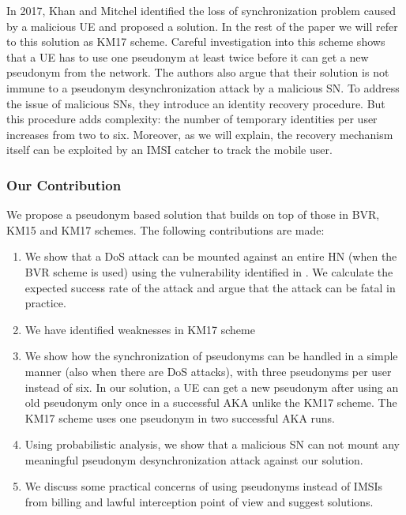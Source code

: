 \documentclass{llncs} %
\begin{document}
In 2017, Khan and Mitchel \cite{wisec17} identified the loss of synchronization problem caused by a malicious UE and proposed a solution. In the rest of the paper we will refer to this solution as KM17 scheme. Careful investigation into this scheme shows that a UE has to use one pseudonym at least twice before it can get a new pseudonym from the network. The authors also argue that their solution is not immune to a pseudonym desynchronization attack by a malicious SN. To address the issue of malicious SNs, they introduce an identity recovery procedure. But this procedure adds complexity: the number of temporary identities per user increases from two to six. Moreover, as we will explain, the recovery mechanism itself can be exploited by an IMSI catcher to track the mobile user.


\subsubsection{Our Contribution}
We propose a pseudonym based solution that builds on top of those in BVR, KM15 and KM17 schemes. The following contributions are made:
\begin{enumerate}
\item We show that a DoS attack can be mounted against an entire HN (when the BVR scheme is used) using the vulnerability identified in \cite{wisec17}. We calculate the expected success rate of the attack and argue that the attack can be fatal in practice.
\item We have identified weaknesses in KM17 scheme
\item We show how the synchronization of pseudonyms can be handled in a simple manner (also when there are DoS attacks), with three pseudonyms per user instead of six. In our solution, a UE can get a new pseudonym after using an old pseudonym only once in a successful AKA unlike the KM17 scheme. The KM17 scheme uses one pseudonym in two successful AKA runs.
\item Using probabilistic analysis, we show that a malicious SN can not mount any meaningful pseudonym desynchronization attack against our solution.
\item We discuss some practical concerns of using pseudonyms instead of IMSIs from billing and lawful interception point of view and suggest solutions.
\end{enumerate}
\end{document}
